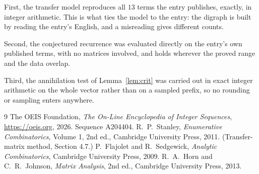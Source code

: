 \documentclass[11pt,a4paper]{article}
\theoremstyle{plain}
\theoremstyle{definition}
\begin{document}
First, the transfer model reproduces all $13$ terms the entry publishes, exactly, in
integer arithmetic. This is what ties the model to the entry: the digraph is built by reading
the entry's English, and a misreading gives different counts.

Second, the conjectured recurrence was evaluated directly on the entry's own published terms,
with no matrices involved, and holds wherever the proved range and the data overlap.

Third, the annihilation test of Lemma~\ref{lem:crit} was carried out in exact integer
arithmetic on the whole vector rather than on a sampled prefix, so no rounding or sampling
enters anywhere.

\begin{thebibliography}{9}
 The OEIS Foundation, \emph{The On-Line Encyclopedia of Integer
Sequences}, \url{https://oeis.org}, 2026. Sequence A204404.
 R.~P.~Stanley, \emph{Enumerative Combinatorics}, Volume 1, 2nd ed.,
Cambridge University Press, 2011. (Transfer-matrix method, Section 4.7.)
 P.~Flajolet and R.~Sedgewick, \emph{Analytic Combinatorics}, Cambridge
University Press, 2009.
 R.~A.~Horn and C.~R.~Johnson, \emph{Matrix Analysis}, 2nd ed., Cambridge
University Press, 2013.
\end{thebibliography}
\end{document}

